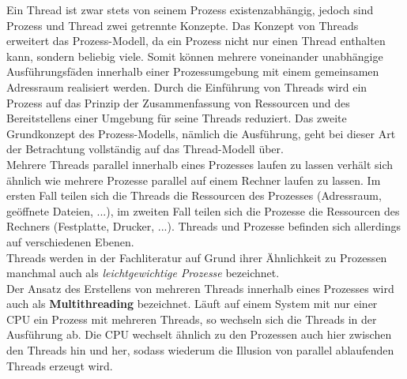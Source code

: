 				Ein Thread ist zwar stets von seinem Prozess existenzabhängig, jedoch sind Prozess und Thread zwei getrennte Konzepte. Das Konzept von Threads erweitert das Prozess-Modell, da ein Prozess nicht nur einen Thread enthalten kann, sondern beliebig viele. Somit können mehrere voneinander unabhängige Ausführungsfäden innerhalb einer Prozessumgebung mit einem gemeinsamen Adressraum realisiert werden. Durch die Einführung von Threads wird ein Prozess auf das Prinzip der Zusammenfassung von Ressourcen und des Bereitstellens einer Umgebung für seine Threads reduziert. Das zweite Grundkonzept des Prozess-Modells, nämlich die Ausführung, geht bei dieser Art der Betrachtung vollständig auf das Thread-Modell über.\\
				Mehrere Threads parallel innerhalb eines Prozesses laufen zu lassen verhält sich ähnlich wie mehrere Prozesse parallel auf einem Rechner laufen zu lassen. Im ersten Fall teilen sich die Threads die Ressourcen des Prozesses (Adressraum, geöffnete Dateien, ...), im zweiten Fall teilen sich die Prozesse die Ressourcen des Rechners (Festplatte, Drucker, ...). Threads und Prozesse befinden sich allerdings auf verschiedenen Ebenen.\\
				Threads werden in der Fachliteratur auf Grund ihrer Ähnlichkeit zu Prozessen manchmal auch als \textit{leichtgewichtige Prozesse} bezeichnet.\\
				Der Ansatz des Erstellens von mehreren Threads innerhalb eines Prozesses wird auch als \textbf{Multithreading} bezeichnet. Läuft auf einem System mit nur einer CPU ein Prozess mit mehreren Threads, so wechseln sich die Threads in der Ausführung ab. Die CPU wechselt ähnlich zu den Prozessen auch hier zwischen den Threads hin und her, sodass wiederum die Illusion von parallel ablaufenden Threads erzeugt wird. \cite{ModerneBetriebssysteme}
				
